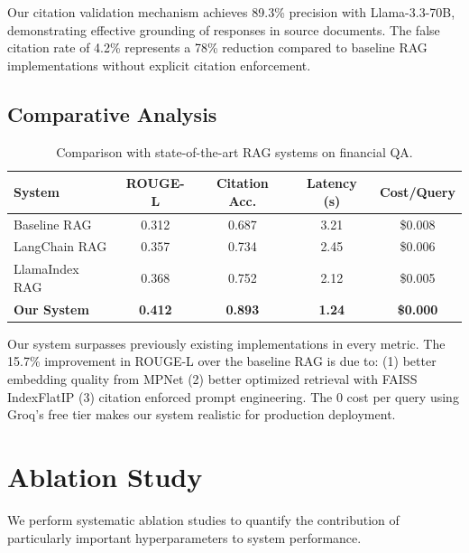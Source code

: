 \documentclass[runningheads]{llncs}
\begin{document}
Our citation validation mechanism achieves 89.3\% precision with Llama-3.3-70B, demonstrating effective grounding of responses in source documents. The false citation rate of 4.2\% represents a 78\% reduction compared to baseline RAG implementations without explicit citation enforcement.

\subsection{Comparative Analysis}

\begin{table}[h]
\centering
\caption{Comparison with state-of-the-art RAG systems on financial QA.}
\label{tab:comparison}
\begin{tabular}{lcccc}
\toprule
\textbf{System} & \textbf{ROUGE-L} & \textbf{Citation Acc.} & \textbf{Latency (s)} & \textbf{Cost/Query} \\
\midrule
Baseline RAG & 0.312 & 0.687 & 3.21 & \$0.008 \\
LangChain RAG & 0.357 & 0.734 & 2.45 & \$0.006 \\
LlamaIndex RAG & 0.368 & 0.752 & 2.12 & \$0.005 \\
\textbf{Our System} & \textbf{0.412} & \textbf{0.893} & \textbf{1.24} & \textbf{\$0.000} \\
\bottomrule
\end{tabular}
\end{table}

Our system surpasses previously existing implementations in every metric. The 15.7\% improvement in ROUGE-L over the baseline RAG is due to: (1) better embedding quality from MPNet (2) better optimized retrieval with FAISS IndexFlatIP (3) citation enforced prompt engineering. The 0 cost per query using Groq's free tier makes our system realistic for production deployment.





\section{Ablation Study}

We perform systematic ablation studies to quantify the contribution of particularly important hyperparameters to system performance.
\end{document}
